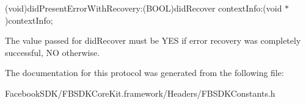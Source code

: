 \begin{DoxyItemize}
\item (void)did\-Present\-Error\-With\-Recovery\-:(\-B\-O\-O\-L)did\-Recover context\-Info\-:(void $\ast$)context\-Info;
\end{DoxyItemize}

The value passed for did\-Recover must be Y\-E\-S if error recovery was completely successful, N\-O otherwise. 

The documentation for this protocol was generated from the following file\-:\begin{DoxyCompactItemize}
\item 
Facebook\-S\-D\-K/\-F\-B\-S\-D\-K\-Core\-Kit.\-framework/\-Headers/F\-B\-S\-D\-K\-Constants.\-h\end{DoxyCompactItemize}
